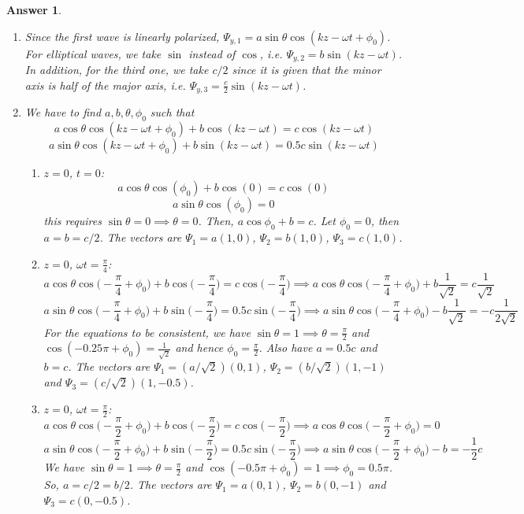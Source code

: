 \documentclass[a4paper]{article}
\newtheorem{ans}{Answer}[section]
\theoremstyle{new}
\begin{document}
\begin{ans}\leavevmode
\begin{enumerate}[label=(\alph*)]
\item Since the first wave is linearly polarized, $\Psi_{y,1}=a\sin\theta\cos(kz-\omega t+\phi_0)$. For elliptical waves, we take $\sin$ instead of $\cos$, i.e. $\Psi_{y,2}=b\sin(kz-\omega t)$. In addition, for the third one, we take $c/2$ since it is given that the minor axis is half of the major axis, i.e. $\Psi_{y,3}=\frac{c}{2}\sin(kz-\omega t)$.
\item We have to find $a,b,\theta,\phi_0$ such that
$$a\cos\theta\cos(kz-\omega t+\phi_0)+b\cos(kz-\omega t)=c\cos(kz-\omega t)$$
$$a\sin\theta\cos(kz-\omega t+\phi_0)+b\sin(kz-\omega t)=0.5c\sin(kz-\omega t)$$
\begin{enumerate}[label=(\roman*)]
\item $z=0$, $t=0$:
$$a\cos\theta\cos(\phi_0)+b\cos(0)=c\cos(0)$$
$$a\sin\theta\cos(\phi_0)=0$$
this requires $\sin\theta=0\implies\theta=0$. Then, $a\cos\phi_0+b=c$. Let $\phi_0=0$, then $a=b=c/2$. The vectors are $\Psi_1=a(1,0)$, $\Psi_2=b(1,0)$, $\Psi_3=c(1,0)$.
\item $z=0$, $\omega t=\frac{\pi}{4}$:
$$a\cos\theta\cos\bigg(-\frac{\pi}{4}+\phi_0\bigg)+b\cos\bigg(-\frac{\pi}{4}\bigg)=c\cos\bigg(-\frac{\pi}{4}\bigg)\implies a\cos\theta\cos\bigg(-\frac{\pi}{4}+\phi_0\bigg)+b\frac{1}{\sqrt{2}}=c\frac{1}{\sqrt{2}}$$
$$a\sin\theta\cos\bigg(-\frac{\pi}{4}+\phi_0\bigg)+b\sin\bigg(-\frac{\pi}{4}\bigg)=0.5c\sin\bigg(-\frac{\pi}{4}\bigg)\implies a\sin\theta\cos\bigg(-\frac{\pi}{4}+\phi_0\bigg)-b\frac{1}{\sqrt{2}}=-c\frac{1}{2\sqrt{2}}$$
For the equations to be consistent, we have $\sin\theta=1\implies\theta=\frac{\pi}{2}$ and $\cos(-0.25\pi+\phi_0)=\frac{1}{\sqrt{2}}$ and hence $\phi_0=\frac{\pi}{2}$. Also have $a=0.5c$ and $b=c$. The vectors are $\Psi_1=(a/\sqrt{2})(0,1)$, $\Psi_2=(b/\sqrt{2})(1,-1)$ and $\Psi_3=(c/\sqrt{2})(1,-0.5)$. 
\item $z=0$, $\omega t=\frac{\pi}{2}$:
$$a\cos\theta\cos\bigg(-\frac{\pi}{2}+\phi_0\bigg)+b\cos\bigg(-\frac{\pi}{2}\bigg)=c\cos\bigg(-\frac{\pi}{2}\bigg)\implies a\cos\theta\cos\bigg(-\frac{\pi}{2}+\phi_0\bigg)=0$$
$$a\sin\theta\cos\bigg(-\frac{\pi}{2}+\phi_0\bigg)+b\sin\bigg(-\frac{\pi}{2}\bigg)=0.5c\sin\bigg(-\frac{\pi}{2}\bigg)\implies a\sin\theta\cos\bigg(-\frac{\pi}{2}+\phi_0\bigg)-b=-\frac{1}{2}c$$
We have $\sin\theta=1\implies\theta=\frac{\pi}{2}$ and $\cos(-0.5\pi+\phi_0)=1\implies\phi_0=0.5\pi$. So, $a=c/2=b/2$. The vectors are $\Psi_1=a(0,1)$, $\Psi_2=b(0,-1)$ and $\Psi_3=c(0,-0.5)$.

\end{enumerate}
\end{enumerate}
\end{ans}
\end{document}

